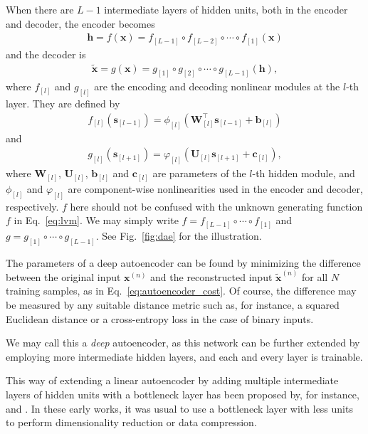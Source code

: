 \documentclass[dissertation,nocontribution]{aaltoseries}
\newcommand{\qlay}[1]{\left[#1\right]}
\newcommand{\vect}[1]{\mathbf{#1}}
\newcommand{\matr}[1]{\mathbf{#1}}
\newcommand{\vb}[0]{\vect{b}}
\newcommand{\vc}[0]{\vect{c}}
\newcommand{\vh}[0]{\vect{h}}
\newcommand{\vx}[0]{\vect{x}}
\newcommand{\vs}[0]{\vect{s}}
\newcommand{\mW}[0]{\matr{W}}
\newcommand{\mU}[0]{\matr{U}}
\begin{document}
When there are $L-1$ intermediate layers of hidden units,
both in the encoder and decoder, the encoder becomes
\begin{align}
    \label{eq:ae_encoder}
    \vh = f(\vx) = f_{
    \qlay{L-1}} \circ f_{\qlay{L-2}} \circ \cdots \circ
    f_{\qlay{1}}(\vx)
\end{align}
and the decoder is
\begin{align}
    \label{eq:ae_decoder}
    \tilde{\vx} = g(\vx) = g_{\qlay{1}} \circ g_{\qlay{2}} \circ \cdots \circ
    g_{\qlay{L-1}} (\vh),
\end{align}
where $f_{\qlay{l}}$ and $g_{\qlay{l}}$ are the encoding and decoding
nonlinear modules at the $l$-th layer. They are
defined by
\begin{align*}
    f_{\qlay{l}}(\vs_{\qlay{l-1}}) = \phi_{\qlay{l}}
    \left(\mW_{\qlay{l}}^\top \vs_{\qlay{l-1}} +
    \vb_{\qlay{l}}\right)
\end{align*}
and
\begin{align*}
    g_{\qlay{l}}(\vs_{\qlay{l+1}}) = \varphi_{\qlay{l}}
    \left(\mU_{\qlay{l}} \vs_{\qlay{l+1}} + \vc_{\qlay{l}}
    \right),
\end{align*}
where $\mW_{\qlay{l}}$, $\mU_{\qlay{l}}$, $\vb_{\qlay{l}}$
and $\vc_{\qlay{l}}$ are parameters
of the $l$-th hidden module, and $\phi_{\qlay{l}}$ and
$\varphi_{\qlay{l}}$
are component-wise nonlinearities used in the encoder and
decoder, respectively.  $f$ here should not be confused with
the unknown generating function $f$ in Eq.~\eqref{eq:lvm}.
We may simply write $f = f_{\qlay{L-1}} \circ \cdots \circ
f_{\qlay{1}}$ and
$g = g_{\qlay{1}} \circ \cdots \circ g_{\qlay{L-1}}$. See Fig.~\ref{fig:dae}
for the illustration.

The parameters of a deep autoencoder can be found by
minimizing the difference between the original input
$\vx^{(n)}$ and the reconstructed input $\tilde{\vx}^{(n)}$
for all $N$ training samples, as in
Eq.~\eqref{eq:autoencoder_cost}. Of course, the difference
may be measured by any suitable distance metric such as, for
instance, a squared Euclidean distance or a cross-entropy
loss in the case of binary inputs.

We may call this a \textit{deep} autoencoder, as 
this network can be further extended by employing
more intermediate hidden layers, and each and every layer is
trainable.

This way of extending a linear autoencoder by adding
multiple intermediate layers of hidden units with a
bottleneck layer has been proposed by, for instance,
\citet{Oja1991} and \citet{Kramer1991}. In these early
works, it was usual to use a bottleneck layer with less
units to perform 
dimensionality reduction or data compression.
\end{document}
